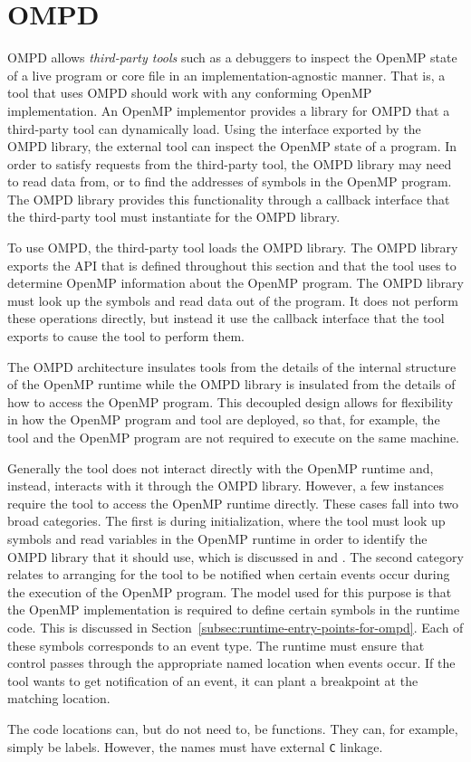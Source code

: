\section{OMPD}
\label{sec:ompd-overview}
\label{sec:third-party-tool-callback-interface}

OMPD allows \emph{third-party tools} such as a debuggers to inspect the 
OpenMP state of a live program or core file in an implementation-agnostic 
manner. That is, a tool that uses OMPD should work with any conforming 
OpenMP implementation. An OpenMP implementor provides a library for OMPD 
that a third-party tool can dynamically load. Using the interface exported 
by the OMPD library, the external tool can inspect the OpenMP state of a 
program. In order to satisfy requests from the third-party tool, the OMPD 
library may need to read data from, or to find the addresses of symbols in 
the OpenMP program. The OMPD library provides this functionality through a 
callback interface that the third-party tool must instantiate for the OMPD library.

To use OMPD, the third-party tool loads the OMPD library. The OMPD library exports 
the API that is defined throughout this section and that the tool uses to 
determine OpenMP information about the OpenMP program. The OMPD library must
look up the symbols and read data out of the program. It does not perform
these operations directly, but instead it use the callback interface that the
tool exports to cause the tool to perform them.

The OMPD architecture insulates tools from the details of the internal structure 
of the OpenMP runtime while the OMPD library is insulated from the details of how 
to access the OpenMP program. This decoupled design allows for flexibility in how 
the OpenMP program and tool are deployed, so that, for example, the tool and the 
OpenMP program are not required to execute on the same machine.

Generally the tool does not interact directly with the OpenMP runtime and, 
instead, interacts with it through the OMPD library. However, a few instances 
require the tool to access the OpenMP runtime directly. These cases fall into 
two broad categories. The first is during initialization, where the tool must
look up symbols and read variables in the OpenMP runtime in order to identify 
the OMPD library that it should use, which is discussed in 
 and 
. The second category relates to 
arranging for the tool to be notified when certain events occur during the 
execution of the OpenMP program.
The model used for this purpose is that the OpenMP implementation
is required to define certain symbols in the runtime code.
This is discussed in Section~\ref{subsec:runtime-entry-points-for-ompd}.
Each of these symbols corresponds to an event type.
The runtime must ensure that control passes through the appropriate
named location when events occur.
If the tool wants to get notification of an event, it can plant
a breakpoint at the matching location.

The code locations can, but do not need to, be functions.
They can, for example, simply be labels.
However, the names must have external \texttt{C} linkage.

